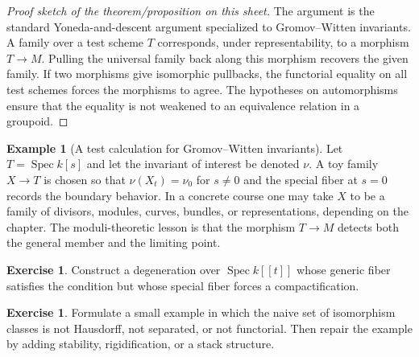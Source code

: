 \documentclass[11pt]{amsart}
\theoremstyle{definition}
\newtheorem{example}[theorem]{Example}
\newtheorem{exercise}[theorem]{Exercise}
\newcommand{\Spec}{\operatorname{Spec}}
\begin{document}
\begin{proof}[Proof sketch of the theorem/proposition on this sheet]
The argument is the standard Yoneda-and-descent argument specialized to Gromov--Witten invariants.  A family over a test scheme $T$ corresponds, under representability, to a morphism $T\to M$.  Pulling the universal family back along this morphism recovers the given family.  If two morphisms give isomorphic pullbacks, the functorial equality on all test schemes forces the morphisms to agree.  The hypotheses on automorphisms ensure that the equality is not weakened to an equivalence relation in a groupoid.
\end{proof}
\begin{example}[A test calculation for Gromov--Witten invariants]
Let $T=\Spec k[s]$ and let the invariant of interest be denoted $\nu$.  A toy family $X\to T$ is chosen so that $\nu(X_t)=\nu_0$ for $s\ne0$ and the special fiber at $s=0$ records the boundary behavior.  In a concrete course one may take $X$ to be a family of divisors, modules, curves, bundles, or representations, depending on the chapter.  The moduli-theoretic lesson is that the morphism $T\to M$ detects both the general member and the limiting point.
\end{example}
\begin{exercise}
Construct a degeneration over $\Spec k[[t]]$ whose generic fiber satisfies the condition but whose special fiber forces a compactification.
\end{exercise}
\begin{exercise}
Formulate a small example in which the naive set of isomorphism classes is not Hausdorff, not separated, or not functorial.  Then repair the example by adding stability, rigidification, or a stack structure.
\end{exercise}
\clearpage
\end{document}
